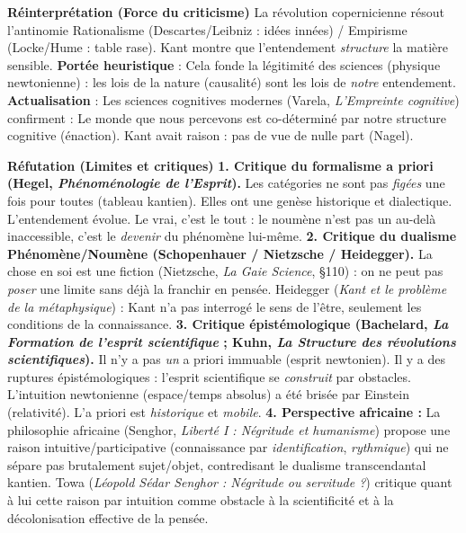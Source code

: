 \documentclass[11pt]{article}
\newcommand{\cle}[1]{{\popxbold\color{popdark}#1}}
\begin{document}
\begin{exoresolu}
    \textbf{Réinterprétation (Force du criticisme)}
    La \cle{révolution copernicienne} résout l'antinomie \cle{Rationalisme} (Descartes/Leibniz : idées innées) / \cle{Empirisme} (Locke/Hume : table rase). Kant montre que l'entendement \emph{structure} la matière sensible. \textbf{Portée heuristique} : Cela fonde la \cle{légitimité des sciences} (physique newtonienne) : les lois de la nature (causalité) sont les lois de \emph{notre} entendement. \textbf{Actualisation} : Les sciences cognitives modernes (Varela, \emph{L'Empreinte cognitive}) confirment : \guillemotleft Le monde que nous percevons est co-déterminé par notre structure cognitive \guillemotright (\cle{énaction}). Kant avait raison : pas de \guillemotleft vue de nulle part \guillemotright (Nagel).

    \textbf{Réfutation (Limites et critiques)}
    \textbf{1. Critique du \cle{formalisme a priori} (Hegel, \emph{Phénoménologie de l'Esprit}).} Les catégories ne sont pas \emph{figées} une fois pour toutes (tableau kantien). Elles ont une \cle{genèse historique} et dialectique. L'entendement évolue. \guillemotleft Le vrai, c'est le tout \guillemotright : le noumène n'est pas un \guillemotleft au-delà \guillemotright inaccessible, c'est le \emph{devenir} du phénomène lui-même.
    \textbf{2. Critique du \cle{dualisme} Phénomène/Noumène (Schopenhauer / Nietzsche / Heidegger).} \guillemotleft La chose en soi \guillemotright est une \guillemotleft fiction \guillemotright (Nietzsche, \emph{La Gaie Science}, §110) : on ne peut pas \emph{poser} une limite sans déjà la franchir en pensée. Heidegger (\emph{Kant et le problème de la métaphysique}) : Kant n'a pas interrogé le \cle{sens de l'être}, seulement les conditions de la \cle{connaissance}.
    \textbf{3. Critique épistémologique (Bachelard, \emph{La Formation de l'esprit scientifique} ; Kuhn, \emph{La Structure des révolutions scientifiques}).} Il n'y a pas \emph{un} a priori immuable (esprit newtonien). Il y a des \cle{ruptures épistémologiques} : l'esprit scientifique se \emph{construit} par obstacles. L'intuition newtonienne (espace/temps absolus) a été brisée par Einstein (relativité). L'a priori est \emph{historique} et \emph{mobile}.
    \textbf{4. Perspective africaine :} La \cle{philosophie africaine} (Senghor, \emph{Liberté I : Négritude et humanisme}) propose une \cle{raison intuitive/participative} (connaissance par \emph{identification}, \emph{rythmique}) qui ne sépare pas brutalement sujet/objet, contredisant le \cle{dualisme transcendantal} kantien. Towa (\emph{Léopold Sédar Senghor : Négritude ou servitude ?}) critique quant à lui cette \guillemotleft raison par intuition \guillemotright comme obstacle à la scientificité et à la décolonisation effective de la pensée.


\end{exoresolu}
\end{document}
